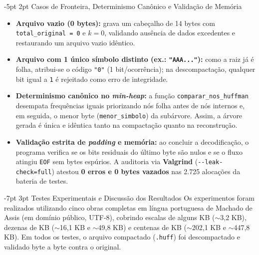 \documentclass[a4paper,10pt]{article}
\makeatletter
\renewcommand\section{\@startsection {section}{1}{\z@}%
                                   {-7pt \@plus -2pt \@minus -1pt}%
                                   {3pt \@plus 1pt}%
                                   {\normalfont\large\bfseries}}
\renewcommand\subsection{\@startsection{subsection}{2}{\z@}%
                                     {-5pt \@plus -1pt \@minus -1pt}%
                                     {2pt \@plus 1pt}%
                                     {\normalfont\normalsize\bfseries}}
\makeatother
\begin{document}
\subsection{Casos de Fronteira, Determinismo Canônico e Validação de Memória}
\begin{itemize}\setlength{\itemsep}{1.5pt}\setlength{\parskip}{0pt}\setlength{\topsep}{2pt}
  \item \textbf{Arquivo vazio (0 bytes):} grava um cabeçalho de 14 bytes com \texttt{total\_original = 0} e $k = 0$, validando ausência de dados excedentes e restaurando um arquivo vazio idêntico.
  \item \textbf{Arquivo com 1 único símbolo distinto (ex.: \texttt{"AAA..."}):} como a raiz já é folha, atribui-se o código \texttt{"0"} (1 bit/ocorrência); na descompactação, qualquer bit igual a \texttt{1} é rejeitado como erro de integridade.
  \item \textbf{Determinismo canônico no \emph{min-heap}:} a função \texttt{comparar\_nos\_huffman} desempata frequências iguais priorizando nós folha antes de nós internos e, em seguida, o menor byte (\texttt{menor\_simbolo}) da subárvore. Assim, a árvore gerada é única e idêntica tanto na compactação quanto na reconstrução.
  \item \textbf{Validação estrita de \emph{padding} e memória:} ao concluir a decodificação, o programa verifica se os bits residuais do último byte são nulos e se o fluxo atingiu \texttt{EOF} sem bytes espúrios. A auditoria via \textbf{Valgrind} (\texttt{-{}-leak-check=full}) atestou \textbf{0 erros e 0 bytes vazados} nas 2.725 alocações da bateria de testes.
\end{itemize}

\newpage

\section{Testes Experimentais e Discussão dos Resultados}
Os experimentos foram realizados utilizando cinco obras completas em língua portuguesa de Machado de Assis (em domínio público, UTF-8), cobrindo escalas de alguns KB ($\sim$3,2 KB), dezenas de KB ($\sim$16,1 KB e $\sim$49,8 KB) e centenas de KB ($\sim$202,1 KB e $\sim$447,8 KB). Em todos os testes, o arquivo compactado (\texttt{.huff}) foi descompactado e validado byte a byte contra o original.
\end{document}
